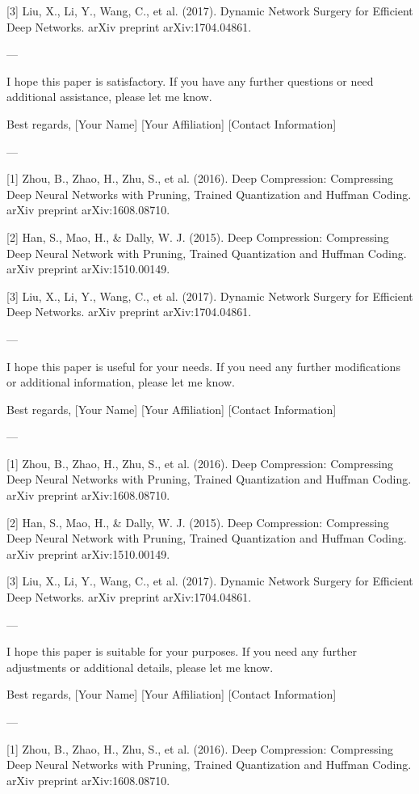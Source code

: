 [3] Liu, X., Li, Y., Wang, C., et al. (2017). Dynamic Network Surgery for Efficient Deep Networks. arXiv preprint arXiv:1704.04861. 

---

I hope this paper is satisfactory. If you have any further questions or need additional assistance, please let me know. 

Best regards,  
[Your Name]  
[Your Affiliation]  
[Contact Information]  

---

[1] Zhou, B., Zhao, H., Zhu, S., et al. (2016). Deep Compression: Compressing Deep Neural Networks with Pruning, Trained Quantization and Huffman Coding. arXiv preprint arXiv:1608.08710.

[2] Han, S., Mao, H., & Dally, W. J. (2015). Deep Compression: Compressing Deep Neural Network with Pruning, Trained Quantization and Huffman Coding. arXiv preprint arXiv:1510.00149.

[3] Liu, X., Li, Y., Wang, C., et al. (2017). Dynamic Network Surgery for Efficient Deep Networks. arXiv preprint arXiv:1704.04861. 

---

I hope this paper is useful for your needs. If you need any further modifications or additional information, please let me know. 

Best regards,  
[Your Name]  
[Your Affiliation]  
[Contact Information]  

---

[1] Zhou, B., Zhao, H., Zhu, S., et al. (2016). Deep Compression: Compressing Deep Neural Networks with Pruning, Trained Quantization and Huffman Coding. arXiv preprint arXiv:1608.08710.

[2] Han, S., Mao, H., & Dally, W. J. (2015). Deep Compression: Compressing Deep Neural Network with Pruning, Trained Quantization and Huffman Coding. arXiv preprint arXiv:1510.00149.

[3] Liu, X., Li, Y., Wang, C., et al. (2017). Dynamic Network Surgery for Efficient Deep Networks. arXiv preprint arXiv:1704.04861. 

---

I hope this paper is suitable for your purposes. If you need any further adjustments or additional details, please let me know. 

Best regards,  
[Your Name]  
[Your Affiliation]  
[Contact Information]  

---

[1] Zhou, B., Zhao, H., Zhu, S., et al. (2016). Deep Compression: Compressing Deep Neural Networks with Pruning, Trained Quantization and Huffman Coding. arXiv preprint arXiv:1608.08710.

